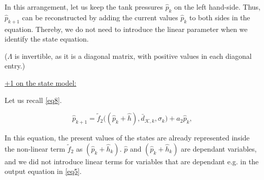 In this arrangement, let us keep the tank pressures $\hat{p}_k$ on the left hand-side. Thus, $\hat{p}_{k+1}$ can be reconstructed by adding the current values $\hat{p}_k$ to both sides in the equation. Thereby, we do not need to introduce the linear parameter when we identify the state equation.  

($\Lambda$ is invertible, as it is a diagonal matrix, with positive values in each diagonal entry.)

\underline{+1 on the state model:} 

Let us recall \eqref{eq8}.

\begin{equation}
\label{eq10}
\hat{p}_{k+1} = \tilde{f}_2\big( (\hat{p}_k + \hat{h}),\bar{d}_{\mathcal{K},k}, \sigma_k\big) + a_2 \hat{p}_k,
\end{equation}

In this equation, the present values of the states are already represented inside the non-linear term $\tilde{f}_2$ as $(\hat{p}_k + \hat{h}_k)$. $\hat{p}$ and $(\hat{p}_k + \hat{h}_k)$ are dependant variables, and we did not introduce linear terms for variables that are dependant e.g. in the output equation in \eqref{eq5}. 






